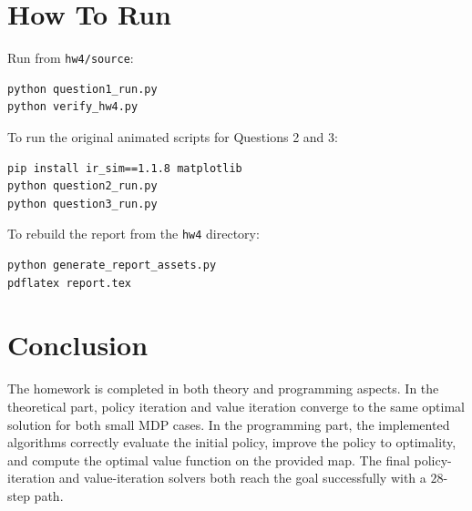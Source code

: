 \documentclass[11pt,a4paper]{article}
\begin{document}
\section{How To Run}

Run from \texttt{hw4/source}:

\begin{verbatim}
python question1_run.py
python verify_hw4.py
\end{verbatim}

To run the original animated scripts for Questions 2 and 3:

\begin{verbatim}
pip install ir_sim==1.1.8 matplotlib
python question2_run.py
python question3_run.py
\end{verbatim}

To rebuild the report from the \texttt{hw4} directory:

\begin{verbatim}
python generate_report_assets.py
pdflatex report.tex
\end{verbatim}

\section{Conclusion}

The homework is completed in both theory and programming aspects. In the theoretical part, policy iteration and value iteration converge to the same optimal solution for both small MDP cases. In the programming part, the implemented algorithms correctly evaluate the initial policy, improve the policy to optimality, and compute the optimal value function on the provided map. The final policy-iteration and value-iteration solvers both reach the goal successfully with a $28$-step path.
\end{document}
